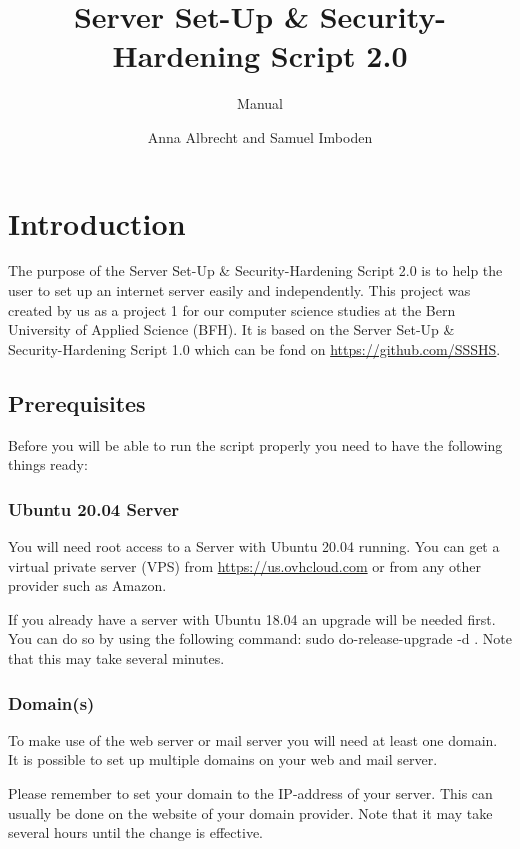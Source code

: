 \documentclass[a4paper,10pt]{scrartcl}
\title{Server Set-Up \& Security-Hardening Script 2.0}
\author{Anna Albrecht and Samuel Imboden}
\subtitle {Manual}
\begin{document}
\maketitle


\pagebreak
\tableofcontents
\pagebreak

\section{Introduction}

The purpose of the Server Set-Up \& Security-Hardening Script 2.0 is to help the user to set up an internet server easily and independently. This project was created by us as a project 1 for our computer science studies at the Bern University of Applied Science (BFH). It is based on the Server Set-Up \& Security-Hardening Script 1.0 which can be fond on \url{https://github.com/SSSHS}.

\subsection{Prerequisites}
Before you will be able to run the script properly you need to have the following things ready:

\subsubsection{Ubuntu 20.04 Server}

You will need root access to a Server with Ubuntu 20.04 running. You can get a virtual private server (VPS) from \url{https://us.ovhcloud.com} or from any other provider such as Amazon. \newline

\noindent If you already have a server with Ubuntu 18.04 an upgrade will be needed first. You can do so by using the following command: sudo do-release-upgrade -d . Note that this may take several minutes.

\subsubsection{Domain(s)}

To make use of the web server or mail server you will need at least one domain. It is possible to set up multiple domains on your web and mail server. \newline

\noindent Please remember to set your domain to the IP-address of your server. This can usually be done on the website of your domain provider. Note that it may take several hours until the change is effective.
\end{document}
